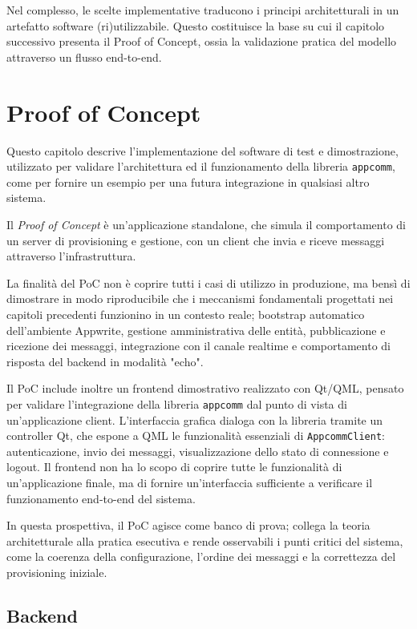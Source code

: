 \documentclass[a4paper, 11pt, twoside]{report}
\begin{document}
Nel complesso, le scelte implementative traducono i principi architetturali in un artefatto software (ri)utilizzabile.
Questo costituisce la base su cui il capitolo successivo presenta il Proof of Concept, ossia la validazione pratica del modello
attraverso un flusso end-to-end.

\chapter{Proof of Concept}

Questo capitolo descrive l'implementazione del software di test e dimostrazione, utilizzato per validare l'architettura ed il
funzionamento della libreria \texttt{appcomm}, come per fornire un esempio per una futura integrazione in qualsiasi altro sistema.

Il \textit{Proof of Concept} è un'applicazione standalone, che simula il comportamento di un server di provisioning e gestione, con un client che invia e riceve messaggi attraverso l'infrastruttura.

La finalità del PoC non è coprire tutti i casi di utilizzo in produzione, ma bensì di dimostrare in modo riproducibile che i
meccanismi fondamentali progettati nei capitoli precedenti funzionino in un contesto reale; bootstrap automatico dell'ambiente
Appwrite, gestione amministrativa delle entità, pubblicazione e ricezione dei messaggi, integrazione con il canale realtime e
comportamento di risposta del backend in modalità "echo".

Il PoC include inoltre un frontend dimostrativo realizzato con Qt/QML, pensato per validare l'integrazione della libreria \texttt{appcomm} dal punto di vista di un'applicazione client. L'interfaccia grafica dialoga con la libreria tramite un controller Qt, che espone a QML le funzionalità essenziali di \texttt{AppcommClient}: autenticazione, invio dei messaggi, visualizzazione dello stato di connessione e logout. 
Il frontend non ha lo scopo di coprire tutte le funzionalità di un'applicazione finale, ma di fornire un'interfaccia 
sufficiente a verificare il funzionamento end-to-end del sistema.

In questa prospettiva, il PoC agisce come banco di prova; collega la teoria architetturale alla pratica esecutiva e rende osservabili
i punti critici del sistema, come la coerenza della configurazione, l'ordine dei messaggi e la correttezza del provisioning iniziale.

\newpage

\section{Backend}
\end{document}
